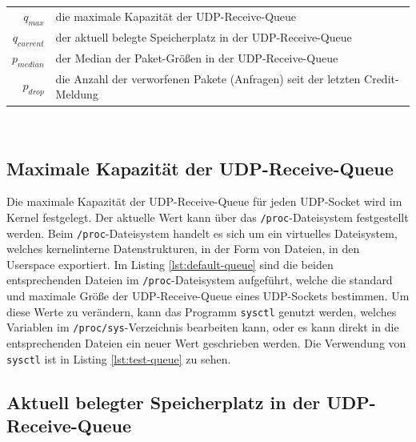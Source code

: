 \documentclass[a4paper, 12pt, BCOR10mm, DIV12, toc=bibliography, toc=listof, german]{scrbook}
\begin{document}
		\begin{tabular}{rl}
			$q_{max}$		  & die maximale Kapazität der UDP-Receive-Queue\\
			$q_{current}$ &	der aktuell belegte Speicherplatz in der UDP-Receive-Queue\\
			$p_{median}$  &	der Median der Paket-Größen in der UDP-Receive-Queue\\
			$p_{drop}$    &	die Anzahl der verworfenen Pakete (Anfragen) seit der letzten Credit-Meldung\\
		\end{tabular}

		$~$\\
		\subsection*{Maximale Kapazität der UDP-Receive-Queue} %

		
		

		Die maximale Kapazität der UDP-Receive-Queue für jeden UDP-Socket wird im Kernel festgelegt. Der
		aktuelle Wert kann über das \texttt{/proc}-Dateisystem festgestellt werden. Beim
		\texttt{/proc}-Dateisystem \cite{benvenuti2005} handelt es sich um ein virtuelles Dateisystem,
		welches kernelinterne Datenstrukturen, in der Form von Dateien, in den Userspace exportiert. Im
		Listing \ref{lst:default-queue} sind die beiden entsprechenden Dateien im
		\texttt{/proc}-Dateisystem aufgeführt, welche die standard und maximale Größe der
		UDP-Receive-Queue eines UDP-Sockets bestimmen. Um diese Werte zu verändern, kann das Programm
		\texttt{sysctl} genutzt werden, welches Variablen im \texttt{/proc/sys}-Verzeichnis bearbeiten
		kann, oder es kann direkt in die entsprechenden Dateien ein neuer Wert geschrieben werden. Die
		Verwendung von \texttt{sysctl} ist in Listing \ref{lst:test-queue} zu sehen.

		\subsection*{Aktuell belegter Speicherplatz in der UDP-Receive-Queue} %
\end{document}
